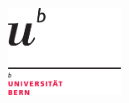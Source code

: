 \thispagestyle{empty}
\begin{addmargin}[-1cm]{-3cm}
    \begin{center}
        \large  

        \vfill

		\begingroup
			\color{Maroon}\spacedallcaps{\myTitle} \\ \bigskip
		\endgroup
		\myDegree
		\vfill
		\spacedallcaps{\myName}
    \end{center}
	\vfill
	\begin{flushright}
	\includegraphics[width=3cm]{img/ub-logo}
	\end{flushright}
\end{addmargin}